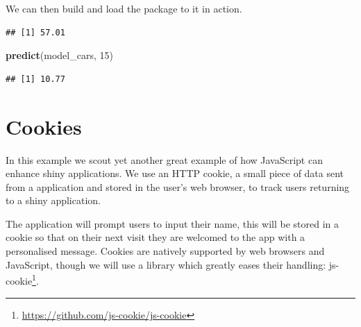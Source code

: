 \documentclass[
]{krantz}
\makeatletter
\newenvironment{Shaded}{\begin{snugshade}}{\end{snugshade}}
\newcommand{\CommentTok}[1]{\textcolor[rgb]{0.37,0.37,0.37}{\textit{#1}}}
\newcommand{\DecValTok}[1]{\textcolor[rgb]{0.06,0.06,0.06}{#1}}
\newcommand{\KeywordTok}[1]{\textcolor[rgb]{0.27,0.27,0.27}{\textbf{#1}}}
\newcommand{\NormalTok}[1]{#1}
\newcommand{\OperatorTok}[1]{\textcolor[rgb]{0.43,0.43,0.43}{\textbf{#1}}}
\newcommand{\StringTok}[1]{\textcolor[rgb]{0.5,0.5,0.5}{#1}}
\renewcommand{\href}[2]{#2\footnote{\url{#1}}}
\newenvironment{kframe}{%
\medskip{}
\setlength{\fboxsep}{.8em}
 \def\at@end@of@kframe{}%
 \ifinner\ifhmode%
  \def\at@end@of@kframe{\end{minipage}}%
  \begin{minipage}{\columnwidth}%
 \fi\fi%
 \def\FrameCommand##1{\hskip\@totalleftmargin \hskip-\fboxsep
 \colorbox{shadecolor}{##1}\hskip-\fboxsep
     \hskip-\linewidth \hskip-\@totalleftmargin \hskip\columnwidth}%
 \MakeFramed {\advance\hsize-\width
   \@totalleftmargin\z@ \linewidth\hsize
   \@setminipage}}%
 {\par\unskip\endMakeFramed%
 \at@end@of@kframe}
\renewenvironment{Shaded}{\begin{kframe}}{\end{kframe}}
\makeatother
\begin{document}
We can then build and load the package to it in action.

\begin{Shaded}
\end{Shaded}

\begin{verbatim}
## [1] 57.01
\end{verbatim}

\begin{Shaded}
\begin{Highlighting}[]
\KeywordTok{predict}\NormalTok{(model\_cars, }\DecValTok{15}\NormalTok{)}
\end{Highlighting}
\end{Shaded}

\begin{verbatim}
## [1] 10.77
\end{verbatim}

\hypertarget{cookies}{%
\chapter{Cookies}\label{cookies}}

In this example we scout yet another great example of how JavaScript can enhance shiny applications. We use an HTTP cookie, a small piece of data sent from a application and stored in the user's web browser, to track users returning to a shiny application.

The application will prompt users to input their name, this will be stored in a cookie so that on their next visit they are welcomed to the app with a personalised message. Cookies are natively supported by web browsers and JavaScript, though we will use a library which greatly eases their handling: \href{https://github.com/js-cookie/js-cookie}{js-cookie}.
\end{document}
